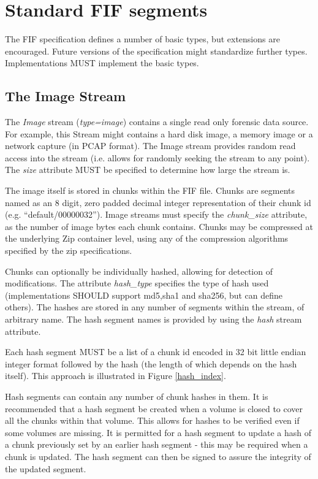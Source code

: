 \documentclass[10pt, conference]{IEEEtran}
\begin{document}
\section{Standard FIF segments}
The FIF specification defines a number of basic types, but extensions
are encouraged. Future versions of the specification might standardize
further types. Implementations MUST implement the basic types.

\subsection{The Image Stream}
\label{image_stream}
The {\em Image} stream ({\em type=image}) contains a single read only
forensic data source. For example, this Stream might contains a hard
disk image, a memory image or a network capture (in PCAP format). The
Image stream provides random read access into the stream (i.e. allows
for randomly seeking the stream to any point). The {\em size}
attribute MUST be specified to determine how large the stream is.

The image itself is stored in chunks within the FIF file. Chunks are
segments named as an 8 digit, zero padded decimal integer
representation of their chunk id (e.g. ``default/00000032''). Image
streams must specify the {\em chunk\_size} attribute, as the number of
image bytes each chunk contains. Chunks may be compressed at the
underlying Zip container level, using any of the compression
algorithms specified by the zip specifications.

Chunks can optionally be individually hashed, allowing for detection
of modifications. The attribute {\em hash\_type} specifies the type of
hash used (implementations SHOULD support md5,sha1 and sha256, but can
define others). The hashes are stored in any number of segments within
the stream, of arbitrary name. The hash segment names is provided by
using the {\em hash} stream attribute.

Each hash segment MUST be a list of a chunk id encoded in 32 bit
little endian integer format followed by the hash (the length of which
depends on the hash itself). This approach is illustrated in Figure
\ref{hash_index}. 

Hash segments can contain any number of chunk hashes in them. It is
recommended that a hash segment be created when a volume is closed to
cover all the chunks within that volume. This allows for hashes to be
verified even if some volumes are missing. It is permitted for a hash
segment to update a hash of a chunk previously set by an earlier hash
segment - this may be required when a chunk is updated. The hash
segment can then be signed to assure the integrity of the updated
segment.
\end{document}
